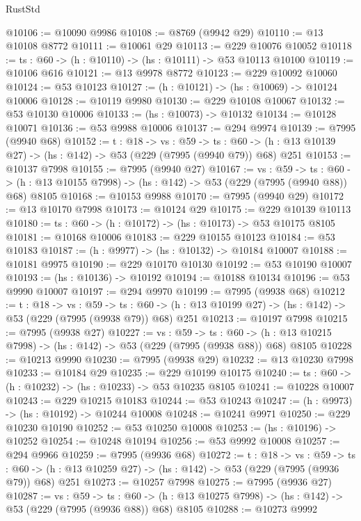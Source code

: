 \begin{lexlean}{RustStd}
\begin{coremodule}
@10106 := @10090 @9986
@10108 := @8769 (@9942 @29)
@10110 := @13 @10108 @8772
@10111 := @10061 @29
@10113 := @229 @10076 @10052
@10118 := {ts : @60} -> (h : @10110) -> (hs : @10111) -> @53 @10113 @10100
@10119 := @10106 @616
@10121 := @13 @9978 @8772
@10123 := @229 @10092 @10060
@10124 := @53 @10123
@10127 := (h : @10121) -> (hs : @10069) -> @10124 @10006
@10128 := @10119 @9980
@10130 := @229 @10108 @10067
@10132 := @53 @10130 @10006
@10133 := (hs : @10073) -> @10132
@10134 := @10128 @10071
@10136 := @53 @9988 @10006
@10137 := @294 @9974
@10139 := @7995 (@9940 @68)
@10152 := {t : @18} ->
  {vs : @59} ->
  {ts : @60} -> (h : @13 @10139 @27) -> (hs : @142) -> @53 (@229 (@7995 (@9940 @79)) @68) @251
@10153 := @10137 @7998
@10155 := @7995 (@9940 @27)
@10167 := {vs : @59} ->
  {ts : @60} -> (h : @13 @10155 @7998) -> (hs : @142) -> @53 (@229 (@7995 (@9940 @88)) @68) @8105
@10168 := @10153 @9988
@10170 := @7995 (@9940 @29)
@10172 := @13 @10170 @7998
@10173 := @10124 @29
@10175 := @229 @10139 @10113
@10180 := {ts : @60} -> (h : @10172) -> (hs : @10173) -> @53 @10175 @8105
@10181 := @10168 @10006
@10183 := @229 @10155 @10123
@10184 := @53 @10183
@10187 := (h : @9977) -> (hs : @10132) -> @10184 @10007
@10188 := @10181 @9975
@10190 := @229 @10170 @10130
@10192 := @53 @10190 @10007
@10193 := (hs : @10136) -> @10192
@10194 := @10188 @10134
@10196 := @53 @9990 @10007
@10197 := @294 @9970
@10199 := @7995 (@9938 @68)
@10212 := {t : @18} ->
  {vs : @59} ->
  {ts : @60} -> (h : @13 @10199 @27) -> (hs : @142) -> @53 (@229 (@7995 (@9938 @79)) @68) @251
@10213 := @10197 @7998
@10215 := @7995 (@9938 @27)
@10227 := {vs : @59} ->
  {ts : @60} -> (h : @13 @10215 @7998) -> (hs : @142) -> @53 (@229 (@7995 (@9938 @88)) @68) @8105
@10228 := @10213 @9990
@10230 := @7995 (@9938 @29)
@10232 := @13 @10230 @7998
@10233 := @10184 @29
@10235 := @229 @10199 @10175
@10240 := {ts : @60} -> (h : @10232) -> (hs : @10233) -> @53 @10235 @8105
@10241 := @10228 @10007
@10243 := @229 @10215 @10183
@10244 := @53 @10243
@10247 := (h : @9973) -> (hs : @10192) -> @10244 @10008
@10248 := @10241 @9971
@10250 := @229 @10230 @10190
@10252 := @53 @10250 @10008
@10253 := (hs : @10196) -> @10252
@10254 := @10248 @10194
@10256 := @53 @9992 @10008
@10257 := @294 @9966
@10259 := @7995 (@9936 @68)
@10272 := {t : @18} ->
  {vs : @59} ->
  {ts : @60} -> (h : @13 @10259 @27) -> (hs : @142) -> @53 (@229 (@7995 (@9936 @79)) @68) @251
@10273 := @10257 @7998
@10275 := @7995 (@9936 @27)
@10287 := {vs : @59} ->
  {ts : @60} -> (h : @13 @10275 @7998) -> (hs : @142) -> @53 (@229 (@7995 (@9936 @88)) @68) @8105
@10288 := @10273 @9992

\end{coremodule}
\end{lexlean}
